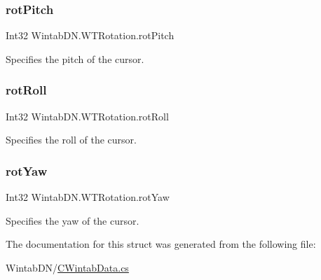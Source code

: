 \subsubsection{\texorpdfstring{rot\+Pitch}{rotPitch}}
{\footnotesize\ttfamily Int32 Wintab\+D\+N.\+W\+T\+Rotation.\+rot\+Pitch}



Specifies the pitch of the cursor. 

\mbox{\label{struct_wintab_d_n_1_1_w_t_rotation_ab249b4f370c315f0d5c69c7c7bfaaaf7}} 
\subsubsection{\texorpdfstring{rot\+Roll}{rotRoll}}
{\footnotesize\ttfamily Int32 Wintab\+D\+N.\+W\+T\+Rotation.\+rot\+Roll}



Specifies the roll of the cursor. 

\mbox{\label{struct_wintab_d_n_1_1_w_t_rotation_a506b0504ac47ba39a4aebadc7a6e16de}} 
\subsubsection{\texorpdfstring{rot\+Yaw}{rotYaw}}
{\footnotesize\ttfamily Int32 Wintab\+D\+N.\+W\+T\+Rotation.\+rot\+Yaw}



Specifies the yaw of the cursor. 



The documentation for this struct was generated from the following file\+:\begin{DoxyCompactItemize}
\item 
Wintab\+D\+N/\mbox{\hyperlink{_c_wintab_data_8cs}{C\+Wintab\+Data.\+cs}}\end{DoxyCompactItemize}
